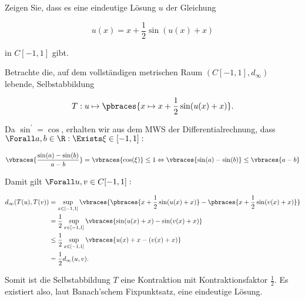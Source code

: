 \begin{exercise}

Zeigen Sie, dass es eine eindeutige Lösung $u$ der Gleichung

\begin{equation*}
  u(x) = x + \frac{1}{2}\sin(u(x)+x)
\end{equation*}

in $C[-1,1]$ gibt.

\end{exercise}

\begin{solution}

Betrachte die, auf dem vollständigen metrischen Raum $(C[-1, 1], d_\infty)$ lebende, Selbstabbildung

\begin{equation*}
  T: u \mapsto \pbraces{x \mapsto x + \frac{1}{2}\sin(u(x)+x)}.
\end{equation*}

Da $\sin^\prime = \cos$, erhalten wir aus dem MWS der Differentialrechnung, dass $\Forall a, b \in \R: \Exists \xi \in [-1,1]:$

\begin{align*}
  \vbraces{\frac{\sin(a)-\sin(b)}{a-b}} = \vbraces{\cos(\xi)} \leq 1 \Leftrightarrow
  \vbraces{\sin(a)-\sin(b)} \leq \vbraces{a-b}
\end{align*}

Damit gilt $\Forall u, v \in C[-1, 1]:$

\begin{align*}
  d_\infty(T(u),T(v))
  & = \sup_{x \in [-1, 1]} \vbraces
  {
    \pbraces{x + \frac{1}{2} \sin(u(x) + x)} -
    \pbraces{x + \frac{1}{2} \sin(v(x) + x)}
  } \\
  & = \frac{1}{2} \sup_{x \in [-1, 1]} \vbraces
  {
    \sin(u(x) + x) -
    \sin(v(x) + x)
  } \\
  & \leq \frac{1}{2}
         \sup_{x \in [-1, 1]}
         \vbraces{u(x) + x - (v(x) + x)} \\
  & = \frac{1}{2}
      d_\infty(u, v).
\end{align*}

Somit ist die Selbstabbildung $T$ eine Kontraktion mit Kontraktionsfaktor $\frac{1}{2}$. Es existiert also, laut Banach'schem Fixpunktsatz, eine
eindeutige Lösung.

\end{solution}
